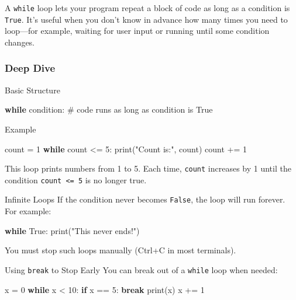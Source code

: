 \documentclass[
  letterpaper,
  DIV=11,
  numbers=noendperiod]{scrreprt}
\newenvironment{Shaded}{\begin{snugshade}}{\end{snugshade}}
\newcommand{\BuiltInTok}[1]{\textcolor[rgb]{0.00,0.23,0.31}{#1}}
\newcommand{\CommentTok}[1]{\textcolor[rgb]{0.37,0.37,0.37}{#1}}
\newcommand{\ControlFlowTok}[1]{\textcolor[rgb]{0.00,0.23,0.31}{\textbf{#1}}}
\newcommand{\DecValTok}[1]{\textcolor[rgb]{0.68,0.00,0.00}{#1}}
\newcommand{\NormalTok}[1]{\textcolor[rgb]{0.00,0.23,0.31}{#1}}
\newcommand{\OperatorTok}[1]{\textcolor[rgb]{0.37,0.37,0.37}{#1}}
\newcommand{\StringTok}[1]{\textcolor[rgb]{0.13,0.47,0.30}{#1}}
\newcommand{\VariableTok}[1]{\textcolor[rgb]{0.07,0.07,0.07}{#1}}
\begin{document}
A \texttt{while} loop lets your program repeat a block of code as long
as a condition is \texttt{True}. It's useful when you don't know in
advance how many times you need to loop---for example, waiting for user
input or running until some condition changes.

\subsubsection{Deep Dive}\label{deep-dive-17}

Basic Structure

\begin{Shaded}
\begin{Highlighting}[]
\ControlFlowTok{while}\NormalTok{ condition:}
    \CommentTok{\# code runs as long as condition is True}
\end{Highlighting}
\end{Shaded}

Example

\begin{Shaded}
\begin{Highlighting}[]
\NormalTok{count }\OperatorTok{=} \DecValTok{1}
\ControlFlowTok{while}\NormalTok{ count }\OperatorTok{\textless{}=} \DecValTok{5}\NormalTok{:}
    \BuiltInTok{print}\NormalTok{(}\StringTok{"Count is:"}\NormalTok{, count)}
\NormalTok{    count }\OperatorTok{+=} \DecValTok{1}
\end{Highlighting}
\end{Shaded}

This loop prints numbers from 1 to 5. Each time, \texttt{count}
increases by 1 until the condition \texttt{count\ \textless{}=\ 5} is no
longer true.

Infinite Loops If the condition never becomes \texttt{False}, the loop
will run forever. For example:

\begin{Shaded}
\begin{Highlighting}[]
\ControlFlowTok{while} \VariableTok{True}\NormalTok{:}
    \BuiltInTok{print}\NormalTok{(}\StringTok{"This never ends!"}\NormalTok{)}
\end{Highlighting}
\end{Shaded}

You must stop such loops manually (Ctrl+C in most terminals).

Using \texttt{break} to Stop Early You can break out of a \texttt{while}
loop when needed:

\begin{Shaded}
\begin{Highlighting}[]
\NormalTok{x }\OperatorTok{=} \DecValTok{0}
\ControlFlowTok{while}\NormalTok{ x }\OperatorTok{\textless{}} \DecValTok{10}\NormalTok{:}
    \ControlFlowTok{if}\NormalTok{ x }\OperatorTok{==} \DecValTok{5}\NormalTok{:}
        \ControlFlowTok{break}
    \BuiltInTok{print}\NormalTok{(x)}
\NormalTok{    x }\OperatorTok{+=} \DecValTok{1}
\end{Highlighting}
\end{Shaded}
\end{document}
